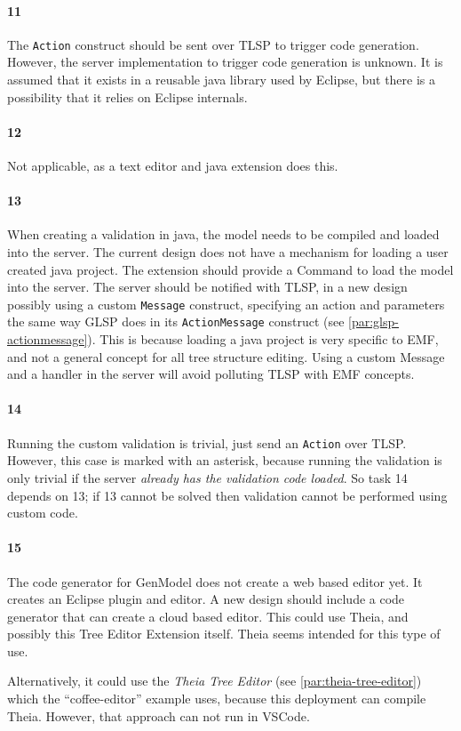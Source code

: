\paragraph{11} The \texttt{Action} construct should be sent over \acrshort{TLSP} to trigger code generation.
However, the server implementation to trigger code generation is unknown.
It is assumed that it exists in a reusable java library used by \gls{Eclipse}, but there is a possibility that it relies on \gls{Eclipse} internals.

\paragraph{12} Not applicable, as a text editor and java extension does this.

\paragraph{13} When creating a validation in java, the model needs to be compiled and loaded into the server.
The current design does not have a mechanism for loading a user created java project.
The extension should provide a Command to load the model into the server.
The server should be notified with \acrshort{TLSP}, in a new design possibly using a custom \texttt{Message} construct, specifying an action and parameters the same way \acrshort{GLSP} does in its \texttt{ActionMessage} construct (see \cref{par:glsp-actionmessage}).
This is because loading a java project is very specific to \acrshort{EMF}, and not a general concept for all tree structure editing.
Using a custom Message and a handler in the server will avoid polluting \acrshort{TLSP} with \acrshort{EMF} concepts.

\paragraph{14} Running the custom validation is trivial, just send an \texttt{Action} over \acrshort{TLSP}.
However, this case is marked with an asterisk, because running the validation is only trivial if the server \textit{already has the validation code loaded}.
So task 14 depends on 13; if 13 cannot be solved then validation cannot be performed using custom code.

\paragraph{15} The code generator for GenModel does not create a web based editor yet.
It creates an \gls{Eclipse} plugin and editor.
A new design should include a code generator that can create a cloud based editor.
This could use \gls{Theia}, and possibly this Tree Editor Extension itself.
Theia seems intended for this type of use.

Alternatively, it could use the \textit{Theia Tree Editor} (see \cref{par:theia-tree-editor}) which the ``coffee-editor'' example uses, because this deployment can compile \gls{Theia}.
However, that approach can not run in \gls{VSCode}.

